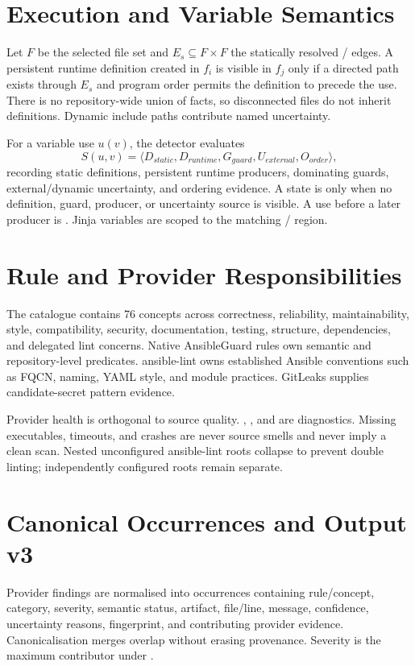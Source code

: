 \section{Execution and Variable Semantics}
Let $F$ be the selected file set and $E_s\subseteq F\times F$ the statically
resolved / edges. A persistent runtime
definition created in $f_i$ is visible in $f_j$ only if a directed path exists
through $E_s$ and program order permits the definition to precede the use.
There is no repository-wide union of facts, so disconnected files do not
inherit definitions. Dynamic include paths contribute named uncertainty.

For a variable use $u(v)$, the detector evaluates
\[
S(u,v)=\langle D_{static},D_{runtime},G_{guard},U_{external},O_{order}\rangle,
\]
recording static definitions, persistent runtime producers, dominating guards,
external/dynamic uncertainty, and ordering evidence. A state is
 only when no definition, guard, producer, or uncertainty
source is visible. A use before a later producer is .
Jinja  variables are scoped to the matching /
region.

\section{Rule and Provider Responsibilities}
The catalogue contains 76 concepts across correctness, reliability,
maintainability, style, compatibility, security, documentation, testing,
structure, dependencies, and delegated lint concerns. Native AnsibleGuard rules
own semantic and repository-level predicates. ansible-lint owns established
Ansible conventions such as FQCN, naming, YAML style, and module practices.
GitLeaks supplies candidate-secret pattern evidence.

Provider health is orthogonal to source quality. ,
, and  are diagnostics. Missing executables,
timeouts, and crashes are never source smells and never imply a clean scan.
Nested unconfigured ansible-lint roots collapse to prevent double linting;
independently configured roots remain separate.

\section{Canonical Occurrences and Output v3}
Provider findings are normalised into occurrences containing rule/concept,
category, severity, semantic status, artifact, file/line, message, confidence,
uncertainty reasons, fingerprint, and contributing provider evidence.
Canonicalisation merges overlap without erasing provenance. Severity is the
maximum contributor under .

